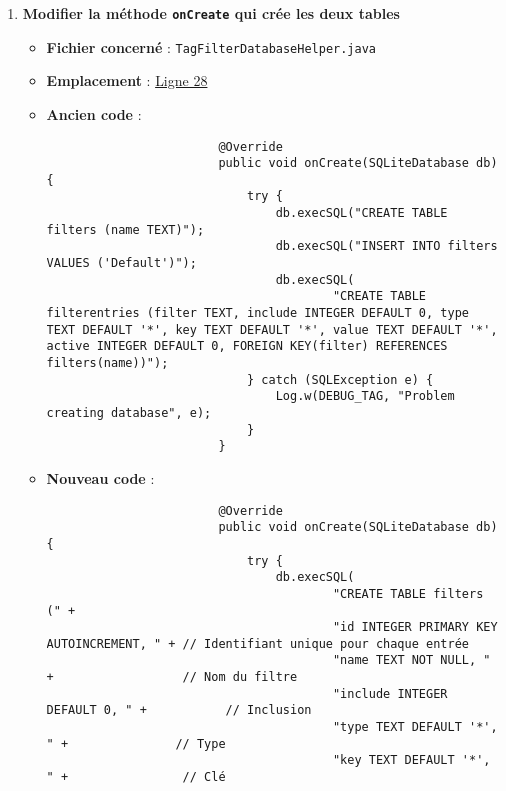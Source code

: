 \begin{enumerate}
    \item \textbf{Modifier la méthode \texttt{onCreate} qui crée les deux tables}
          \begin{itemize}
              \item \textbf{Fichier concerné} : \texttt{TagFilterDatabaseHelper.java}
              \item \textbf{Emplacement} :
                    \href{https://github.com/MarcusWolschon/osmeditor4android/blob/dcabe8084aa15f5551a37c990516bf73398af1bf/src/main/java/de/blau/android/filter/TagFilterDatabaseHelper.java#L28}{Ligne 28}
              \item \textbf{Ancien code} :
                    \begin{verbatim}
                        @Override
                        public void onCreate(SQLiteDatabase db) {
                            try {
                                db.execSQL("CREATE TABLE filters (name TEXT)");
                                db.execSQL("INSERT INTO filters VALUES ('Default')");
                                db.execSQL(
                                        "CREATE TABLE filterentries (filter TEXT, include INTEGER DEFAULT 0, type TEXT DEFAULT '*', key TEXT DEFAULT '*', value TEXT DEFAULT '*', active INTEGER DEFAULT 0, FOREIGN KEY(filter) REFERENCES filters(name))");
                            } catch (SQLException e) {
                                Log.w(DEBUG_TAG, "Problem creating database", e);
                            }
                        }
                    \end{verbatim}
              \item \textbf{Nouveau code} :
                    \begin{verbatim}
                        @Override
                        public void onCreate(SQLiteDatabase db) {
                            try {
                                db.execSQL(
                                        "CREATE TABLE filters (" +
                                        "id INTEGER PRIMARY KEY AUTOINCREMENT, " + // Identifiant unique pour chaque entrée
                                        "name TEXT NOT NULL, " +                  // Nom du filtre
                                        "include INTEGER DEFAULT 0, " +           // Inclusion
                                        "type TEXT DEFAULT '*', " +               // Type
                                        "key TEXT DEFAULT '*', " +                // Clé

\end{verbatim}
\end{itemize}
\end{enumerate}

